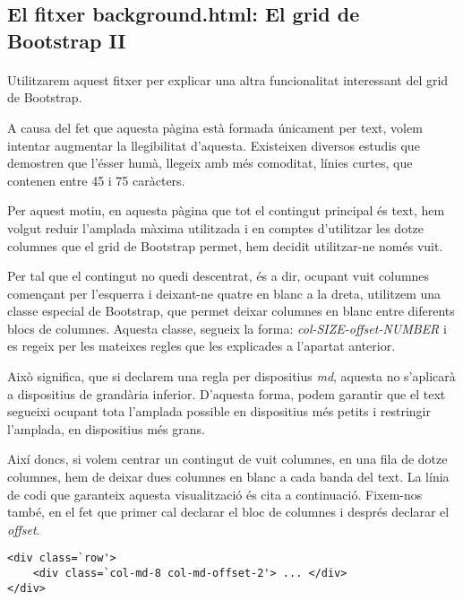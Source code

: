 \subsection{El fitxer background.html: El grid de Bootstrap II}

    \paragraph{}
    Utilitzarem aquest fitxer per explicar una altra funcionalitat interessant del grid de Bootstrap.

    A causa del fet que aquesta pàgina està formada únicament per text, volem intentar augmentar la llegibilitat d'aquesta. Existeixen diversos estudis que demostren que l'ésser humà, llegeix amb més comoditat, línies curtes, que contenen entre 45 i 75 caràcters.

    Per aquest motiu, en aquesta pàgina que tot el contingut principal és text, hem volgut reduir l'amplada màxima utilitzada i en comptes d'utilitzar les dotze columnes que el grid de Bootstrap permet, hem decidit utilitzar-ne només vuit.

    Per tal que el contingut no quedi descentrat, és a dir, ocupant vuit columnes començant per l'esquerra i deixant-ne quatre en blanc a la dreta, utilitzem una classe especial de Bootstrap, que permet deixar columnes en blanc entre diferents blocs de columnes. Aquesta classe, segueix la forma: \emph{col-SIZE-offset-NUMBER} i es regeix per les mateixes regles que les explicades a l'apartat anterior.

    Això significa, que si declarem una regla per dispositius \emph{md}, aquesta no s'aplicarà a dispositius de grandària inferior. D'aquesta forma, podem garantir que el text segueixi ocupant tota l'amplada possible en dispositius més petits i restringir l'ampla\-da, en dispositius més grans.

    Així doncs, si volem centrar un contingut de vuit columnes, en una fila de dotze columnes, hem de deixar dues columnes en blanc a cada banda del text. La línia de codi que garanteix aquesta visualització és cita a continuació. Fixem-nos també, en el fet que primer cal declarar el bloc de columnes i després declarar el \emph{offset}.

    \begin{lstlisting}[style=rawOwn,caption={Separació entre blocs de columnes d'una fila}]
<div class=`row'>
    <div class=`col-md-8 col-md-offset-2'> ... </div>
</div>
    \end{lstlisting}
